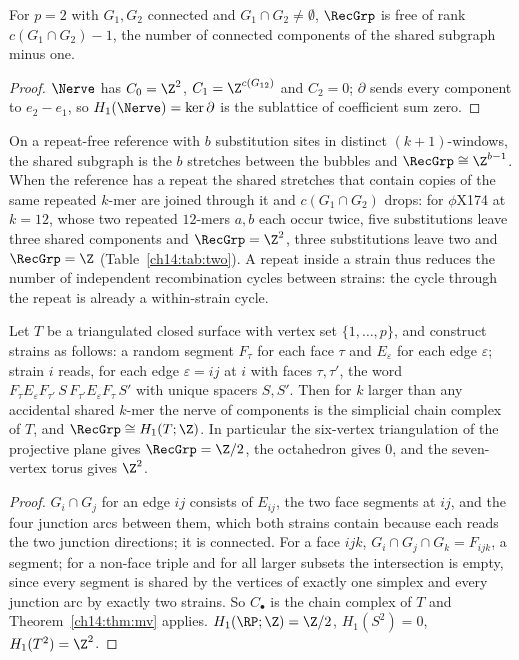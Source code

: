 \begin{corollary}\label{ch14:cor:two}
For $p=2$ with $G_1,G_2$ connected and $G_1\cap G_2\ne\emptyset$, $\RecGrp$ is free of rank
$c(G_1\cap G_2)-1$, the number of connected components of the shared subgraph minus one.
\end{corollary}

\begin{proof}
$\Nerve$ has $C_0=\Z^2$, $C_1=\Z^{c(G_{12})}$ and $C_2=0$; $\partial$ sends every component to
$e_2-e_1$, so $H_1(\Nerve)=\ker\partial$ is the sublattice of coefficient sum zero.
\end{proof}

On a repeat-free reference with $b$ substitution sites in distinct $(k{+}1)$-windows, the
shared subgraph is the $b$ stretches between the bubbles and $\RecGrp\cong\Z^{b-1}$. When the
reference has a repeat the shared stretches that contain copies of the same repeated $k$-mer
are joined through it and $c(G_1\cap G_2)$ drops: for $\phi$X174 at $k=12$, whose two
repeated $12$-mers $a,b$ each occur twice, five substitutions leave three shared components and
$\RecGrp=\Z^2$, three substitutions leave two and $\RecGrp=\Z$ (Table~\ref{ch14:tab:two}). A repeat
inside a strain thus reduces the number of independent recombination cycles between strains:
the cycle through the repeat is already a within-strain cycle.

\begin{proposition}[Torsion]\label{ch14:prop:rp2}
Let $T$ be a triangulated closed surface with vertex set $\{1,\dots,p\}$, and construct
strains as follows: a random segment $F_\tau$ for each face $\tau$ and $E_\varepsilon$ for
each edge $\varepsilon$; strain $i$ reads, for each edge $\varepsilon=ij$ at $i$ with faces
$\tau,\tau'$, the word $F_\tau E_\varepsilon F_{\tau'}\,S\,F_{\tau'}E_\varepsilon F_\tau\,S'$
with unique spacers $S,S'$. Then for $k$ larger than any accidental shared $k$-mer the nerve
of components is the simplicial chain complex of $T$, and $\RecGrp\cong H_1(T;\Z)$. In
particular the six-vertex triangulation of the projective plane gives $\RecGrp=\Z/2$, the
octahedron gives $0$, and the seven-vertex torus gives $\Z^2$.
\end{proposition}

\begin{proof}
$G_i\cap G_j$ for an edge $ij$ consists of $E_{ij}$, the two face segments at $ij$, and the
four junction arcs between them, which both strains contain because each reads the two
junction directions; it is connected. For a face $ijk$, $G_i\cap G_j\cap G_k=F_{ijk}$, a
segment; for a non-face triple and for all larger subsets the intersection is empty, since
every segment is shared by the vertices of exactly one simplex and every junction arc by
exactly two strains. So $C_\bullet$ is the chain complex of $T$ and Theorem~\ref{ch14:thm:mv}
applies. $H_1(\RP;\Z)=\Z/2$, $H_1(S^2)=0$, $H_1(T^2)=\Z^2$.
\end{proof}

